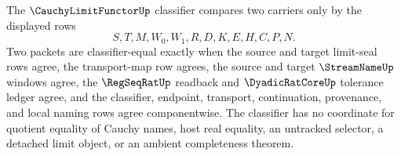 \begin{definition}
\label{def:cauchy-limit-functor-classifier}
The $\CauchyLimitFunctorUp$ classifier compares two carriers only by the displayed rows
$$
S,T,M,W_0,W_1,R,D,K,E,H,C,P,N.
$$
Two packets are classifier-equal exactly when the source and target limit-seal rows agree, the transport-map row agrees, the source and target $\StreamNameUp$ windows agree, the $\RegSeqRatUp$ readback and $\DyadicRatCoreUp$ tolerance ledger agree, and the classifier, endpoint, transport, continuation, provenance, and local naming rows agree componentwise. The classifier has no coordinate for quotient equality of Cauchy names, host real equality, an untracked selector, a detached limit object, or an ambient completeness theorem.
\end{definition}

